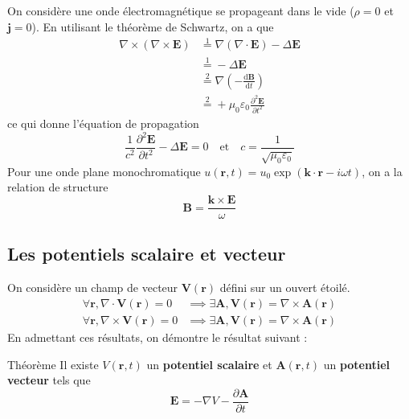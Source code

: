         On considère une onde électromagnétique se propageant dans le vide ($\rho = 0$ et $\mathbf{j} = 0$). En utilisant le théorème de Schwartz, on a que 
        \begin{align*}
            \nabla \times (\nabla \times \mathbf{E}) 
            &\overset{1}{=} \nabla (\nabla \cdot \mathbf{E}) - \Delta \mathbf{E} \\
            &\overset{1}{=} - \Delta \mathbf{E} \\
            &\overset{2}{=} \nabla \left(-\frac{\text{d}\mathbf{B}}{\text{d}t} \right) \\
            &\overset{2}{=} + \mu_0 \varepsilon_0 \frac{\partial^2 \mathbf{E}}{\partial t^2} 
        \end{align*}
        ce qui donne l’équation de propagation 
        \[ \frac{1}{c^2} \frac{\partial^2 \mathbf{E}}{\partial t^2} - \Delta \mathbf{E} = 0 \quad \text{et} \quad c = \frac{1}{\sqrt{\mu_0 \varepsilon_0}} \]   
        Pour une onde plane monochromatique $u(\mathbf{r},t) = u_0 \exp\left(\mathbf{k} \cdot \mathbf{r} - i \omega t\right)$, on a la relation de structure 
        \[ \mathbf{B} = \frac{\mathbf{k} \times \mathbf{E}}{\omega} \]   

    \subsection{Les potentiels scalaire et vecteur}

        On considère un champ de vecteur $\mathbf{V}(\mathbf{r})$ défini sur un ouvert étoilé. 
        \begin{align*}
            \forall \mathbf{r}, \nabla \cdot \mathbf{V}(\mathbf{r}) = 0 &\implies \exists \mathbf{A}, \mathbf{V}(\mathbf{r}) = \nabla \times \mathbf{A}(\mathbf{r}) \\
            \forall \mathbf{r}, \nabla \times \mathbf{V}(\mathbf{r}) = 0 &\implies \exists \mathbf{A}, \mathbf{V}(\mathbf{r}) = \nabla \times \mathbf{A}(\mathbf{r}) 
        \end{align*}
        En admettant ces résultats, on démontre le résultat suivant :

        \begin{omed}{Théorème}
            Il existe $V(\mathbf{r},t)$ un \textbf{potentiel scalaire} et $\mathbf{A}(\mathbf{r},t)$ un \textbf{potentiel vecteur} tels que 
            \[ \mathbf{E} = - \nabla V - \frac{\partial \mathbf{A}}{\partial t} \]   
        \end{omed}

